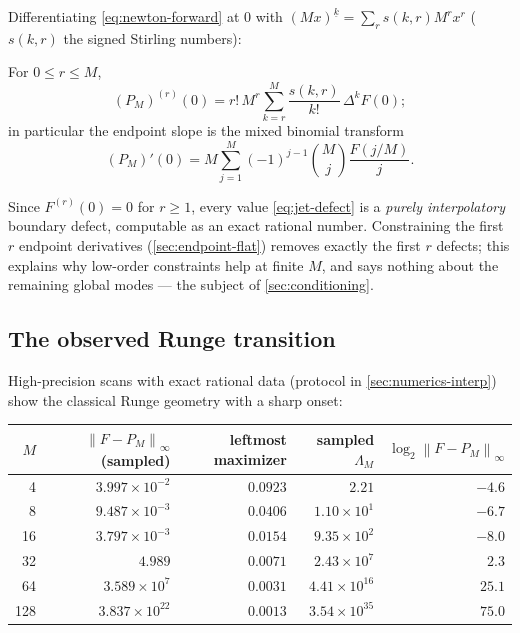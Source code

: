 \documentclass[11pt,oneside]{article}
\numberwithin{equation}{section}
\theoremstyle{definition}
\theoremstyle{remark}
\newcommand{\fall}[2]{#1^{\underline{#2}}}
\newcommand{\norm}[1]{\left\lVert #1\right\rVert}
\begin{document}
Differentiating \eqref{eq:newton-forward} at $0$ with
$\fall{(Mx)}{k}=\sum_r s(k,r)M^{r}x^{r}$ ($s(k,r)$ the signed
Stirling numbers):

\begin{proposition}
\label{prop:jet-defect}
For $0\le r\le M$,
\begin{equation}
 (P_M)^{(r)}(0)
 =r!\,M^{r}\sum_{k=r}^{M}\frac{s(k,r)}{k!}\,\Delta^{k}F(0);
 \label{eq:jet-defect}
\end{equation}
in particular the endpoint slope is the mixed binomial transform
\begin{equation}
 (P_M)'(0)
 =M\sum_{j=1}^{M}(-1)^{j-1}\binom Mj\frac{F(j/M)}{j}.
 \label{eq:endpoint-slope}
\end{equation}
\end{proposition}

Since $F^{(r)}(0)=0$ for $r\ge1$, every value
\eqref{eq:jet-defect} is a \emph{purely interpolatory} boundary
defect, computable as an exact rational number.  Constraining the
first $r$ endpoint derivatives (\cref{sec:endpoint-flat}) removes
exactly the first $r$ defects; this explains why low-order constraints
help at finite $M$, and says nothing about the remaining global modes
--- the subject of \cref{sec:conditioning}.

\subsection{The observed Runge transition}
\label{sec:ordinary-numerics}

High-precision scans with exact rational data (protocol in
\cref{sec:numerics-interp}) show the classical Runge geometry with a
sharp onset:

\begin{center}
\small
\begin{tabular}{rrrrr}
\toprule
$M$ & $\norm{F-P_M}_\infty$ (sampled) & leftmost maximizer &
sampled $\Lambda_M$ & $\log_2\norm{F-P_M}_\infty$ \\
\midrule
4   & $3.997\times10^{-2}$ & $0.0923$ & $2.21$ & $-4.6$ \\
8   & $9.487\times10^{-3}$ & $0.0406$ & $1.10\times10^{1}$ & $-6.7$ \\
16  & $3.797\times10^{-3}$ & $0.0154$ & $9.35\times10^{2}$ & $-8.0$ \\
32  & $4.989$              & $0.0071$ & $2.43\times10^{7}$ & $2.3$ \\
64  & $3.589\times10^{7}$  & $0.0031$ & $4.41\times10^{16}$ & $25.1$ \\
128 & $3.837\times10^{22}$ & $0.0013$ & $3.54\times10^{35}$ & $75.0$ \\
\bottomrule
\end{tabular}
\label{tab:ordinary-errors}
\end{center}
\end{document}
